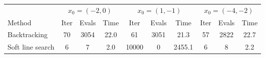 \begin{tabular}{l|ccc|ccc|ccc} \hline \hline 
& \multicolumn{3}{c}{$x_0 = (-2,0)$} & \multicolumn{3}{c}{$x_0 = (1,-1)$} & \multicolumn{3}{c}{$x_0 = (-4,-2)$} \\ 
Method & Iter & Evals & Time & Iter & Evals & Time & Iter & Evals & Time \\ \hline 
Backtracking & 70 & 3054 & 22.0 & 61 & 3051 & 21.3 & 57 & 2822 & 22.7 \\ 
Soft line search & 6 & 7 & 2.0 & 10000 & 0 & 2455.1 & 6 & 8 & 2.2 \\ 
\hline \hline 
\end{tabular} 
